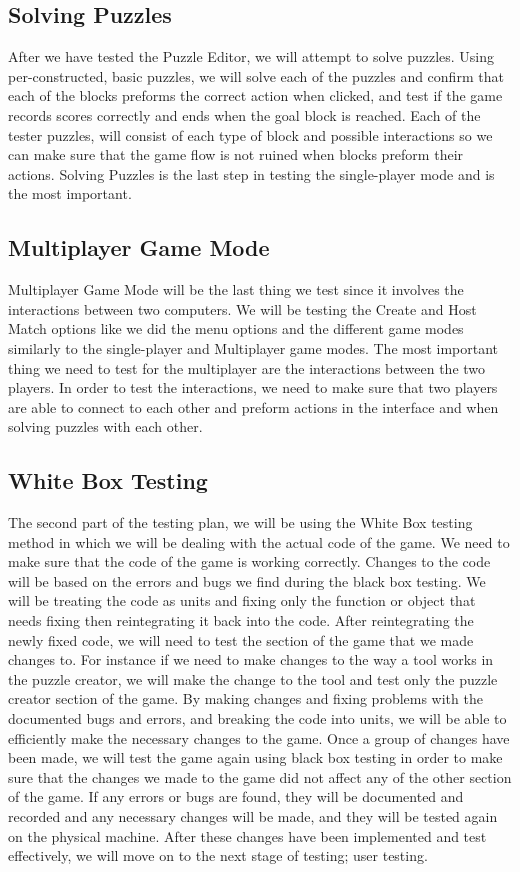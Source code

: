 \documentclass[12pt]{article}
\begin{document}
\subsection{Solving Puzzles}
After we have tested the Puzzle Editor, we will attempt to solve puzzles. Using per-constructed, basic puzzles, we will solve each of the puzzles and confirm that each of the blocks preforms the correct action when clicked, and test if the game records scores correctly and ends when the goal block is reached. Each of the tester puzzles, will consist of each type of block and possible interactions so we can make sure that the game flow is not ruined when blocks preform their actions. Solving Puzzles is the last step in testing the single-player mode and is the most important.

\subsection{Multiplayer Game Mode}
Multiplayer Game Mode will be the last thing we test since it involves the interactions between two computers. We will be testing the Create and Host Match options like we did the menu options and the different game modes similarly to the single-player and Multiplayer game modes. The most important thing we need to test for the multiplayer are the interactions between the two players. In order to test the interactions, we need to make sure that two players are able to connect to each other and preform actions in the interface and when solving puzzles with each other.

\subsection{White Box Testing}
The second part of the testing plan, we will be using the White Box testing method in which we will be dealing with the actual code of the game. We need to make sure that the code of the game is working correctly.
Changes to the code will be based on the errors and bugs we find during the black box testing. We will be treating the code as units and fixing only the function or object that needs fixing then reintegrating it back into the code. After reintegrating the newly fixed code, we will need to test the section of the game that we made changes to. For instance if we need to make changes to the way a tool works in the puzzle creator, we will make the change to the tool and test only the puzzle creator section of the game.
By making changes and fixing problems with the documented bugs and errors, and breaking the code into units, we will be able to efficiently make the necessary changes to the game. Once a group of changes have been made, we will test the game again using black box testing in order to make sure that the changes we made to the game did not affect any of the other section of the game. If any errors or bugs are found, they will be documented and recorded and any necessary changes will be made, and they will be tested again on the physical machine. After these changes have been implemented and test effectively, we will move on to the next stage of testing; user testing.
\end{document}

